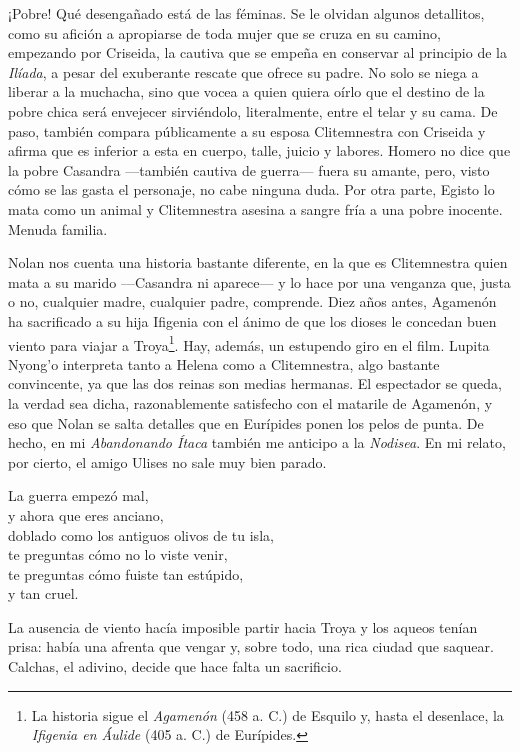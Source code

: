 ¡Pobre! Qué desengañado está de las féminas. Se le olvidan algunos detallitos, como su afición a apropiarse de toda mujer que se cruza en su camino, empezando por Criseida, la cautiva que se empeña en conservar al principio de la \emph{Ilíada}, a pesar del exuberante rescate que ofrece su padre. No solo se niega a liberar a la muchacha, sino que vocea a quien quiera oírlo que el destino de la pobre chica será envejecer sirviéndolo, literalmente, entre el telar y su cama. De paso, también compara públicamente a su esposa Clitemnestra con Criseida y afirma que es inferior a esta en cuerpo, talle, juicio y labores. Homero no dice que la pobre Casandra ---también cautiva de guerra--- fuera su amante, pero, visto cómo se las gasta el personaje, no cabe ninguna duda. Por otra parte, Egisto lo mata como un animal y Clitemnestra asesina a sangre fría a una pobre inocente. Menuda familia.

Nolan nos cuenta una historia bastante diferente, en la que es Clitemnestra quien mata a su marido ---Casandra ni aparece--- y lo hace por una venganza que, justa o no, cualquier madre, cualquier padre, comprende. Diez años antes, Agamenón ha sacrificado a su hija Ifigenia con el ánimo de que los dioses le concedan buen viento para viajar a Troya\footnote{La historia sigue el \emph{Agamenón} (458 a. C.) de Esquilo y, hasta el desenlace, la \emph{Ifigenia en Áulide} (405 a. C.) de Eurípides.}. Hay, además, un estupendo giro en el film. Lupita Nyong'o interpreta tanto a Helena como a Clitemnestra, algo bastante convincente, ya que las dos reinas son medias hermanas. El espectador se queda, la verdad sea dicha, razonablemente satisfecho con el matarile de Agamenón, y eso que Nolan se salta detalles que en Eurípides ponen los pelos de punta. De hecho, en mi \emph{Abandonando Ítaca} también me anticipo a la \emph{Nodisea}. En mi relato, por cierto, el amigo Ulises no sale muy bien parado.

\begin{versopropio}
La guerra empezó mal,\\
y ahora que eres anciano,\\
doblado como los antiguos olivos de tu isla,\\
te preguntas cómo no lo viste venir,\\
te preguntas cómo fuiste tan estúpido,\\
y tan cruel.
\end{versopropio}

La ausencia de viento hacía imposible partir hacia Troya y los aqueos tenían prisa: había una afrenta que vengar y, sobre todo, una rica ciudad que saquear. Calchas, el adivino, decide que hace falta un sacrificio.


